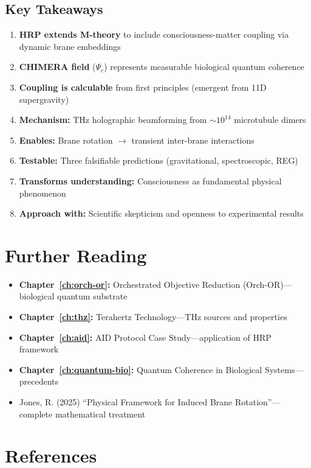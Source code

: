 \subsection*{Key Takeaways}

\begin{enumerate}
\item \textbf{HRP extends M-theory} to include consciousness-matter coupling via dynamic brane embeddings
\item \textbf{CHIMERA field} ($\Psi_c$) represents measurable biological quantum coherence
\item \textbf{Coupling is calculable} from first principles (emergent from 11D supergravity)
\item \textbf{Mechanism:} THz holographic beamforming from $\sim 10^{14}$ microtubule dimers
\item \textbf{Enables:} Brane rotation $\rightarrow$ transient inter-brane interactions
\item \textbf{Testable:} Three falsifiable predictions (gravitational, spectroscopic, REG)
\item \textbf{Transforms understanding:} Consciousness as fundamental physical phenomenon
\item \textbf{Approach with:} Scientific skepticism and openness to experimental results
\end{enumerate}

\section{Further Reading}
\label{sec:further-reading}

\begin{itemize}
\item \textbf{Chapter~\ref{ch:orch-or}:} Orchestrated Objective Reduction (Orch-OR)---biological quantum substrate
\item \textbf{Chapter~\ref{ch:thz}:} Terahertz Technology---THz sources and properties
\item \textbf{Chapter~\ref{ch:aid}:} AID Protocol Case Study---application of HRP framework
\item \textbf{Chapter~\ref{ch:quantum-bio}:} Quantum Coherence in Biological Systems---precedents
\item Jones, R. (2025) ``Physical Framework for Induced Brane Rotation''---complete mathematical treatment
\end{itemize}

\section{References}
\label{sec:references}

